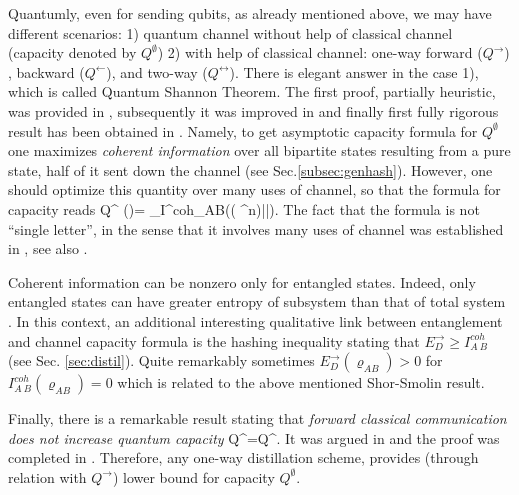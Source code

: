 \documentclass[twocolumn,aps,rmp]{revtex4}
\begin{document}
Quantumly, even for sending qubits, as already mentioned above, we
may have different scenarios: 1) quantum channel without help of
classical channel (capacity denoted by $Q^{ \emptyset }$) 2) with
help of classical channel: one-way forward ($Q^{ \rightarrow }$) ,
backward ($Q^{ \leftarrow }$), and two-way ($Q^{ \leftrightarrow
}$). There is elegant answer in the case 1), which is called Quantum
Shannon Theorem. The first proof, partially heuristic, was provided
in \cite{Lloyd-cap}, subsequently it was improved in
\cite{Shor-cap-notes} and finally first fully rigorous result has been obtained
in \cite{Devetak2003}. Namely, to get asymptotic capacity
formula for $Q^{ \emptyset}$ one maximizes {\it coherent
information} over all bipartite states resulting from a pure state, half of it sent down the channel (see Sec.\ref{subsec:genhash}). However, one should optimize this quantity over many uses of channel, so that the formula for capacity reads
\be
Q^{ \emptyset }(\Lambda)=  \sup_\psi I^{coh}_{A\>B}((\id\ot
\Lambda^{\ot n})|\psi\>\<\psi|).
\ee
The fact that the formula is not ``single letter'', in the sense that it involves many uses of channel was established in \cite{ShorS1996-cohinf}, see also \cite{DSSVeryNoisy}.

Coherent information can be nonzero only for entangled states.
Indeed, only entangled states can have greater entropy of subsystem
than that of total system \cite{RPH1994}. In this context, an
additional interesting qualitative link between entanglement and
channel capacity formula is the hashing inequality stating
that $E_D^\rightarrow\geq I^{coh}_{A\>B}$ (see Sec. \ref{sec:distil}).
Quite remarkably sometimes $E_{D}^{\rightarrow}(\varrho_{AB})>0$ for
$I^{coh}_{A\>B}(\varrho_{AB})=0$  which is related to the above mentioned Shor-Smolin result.

Finally, there is a remarkable result stating that {\it forward
classical communication does not increase quantum capacity} \be
Q^{\emptyset}=Q^{\rightarrow}. \ee It was argued in \cite{BDSW1996}
and  the proof was completed in \cite{BarnumKN-cap-equiv}.
Therefore, any one-way distillation scheme, provides (through
relation with $Q^{\rightarrow}$) lower bound for capacity
$Q^{\emptyset}$.
\end{document}
